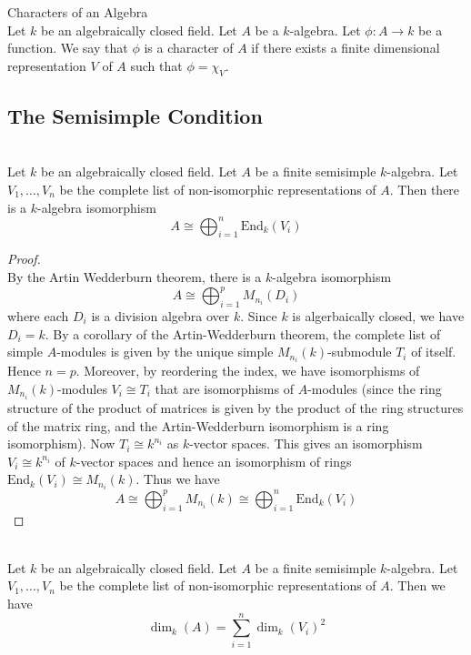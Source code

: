 \documentclass[a4paper]{article}
\begin{document}
\begin{defn}{Characters of an Algebra}{}\\
Let $k$ be an algebraically closed field. Let $A$ be a $k$-algebra. Let $\phi:A\to k$ be a function. We say that $\phi$ is a character of $A$ if there exists a finite dimensional representation $V$ of $A$ such that $\phi=\chi_V$. 
\end{defn}

\subsection{The Semisimple Condition}
\begin{prp}{}{}\\
Let $k$ be an algebraically closed field. Let $A$ be a finite semisimple $k$-algebra. Let $V_1,\dots,V_n$ be the complete list of non-isomorphic representations of $A$. Then there is a $k$-algebra isomorphism $$A\cong\bigoplus_{i=1}^n\text{End}_k(V_i)$$
\begin{proof}\\
By the Artin Wedderburn theorem, there is a $k$-algebra isomorphism $$A\cong\bigoplus_{i=1}^pM_{n_i}(D_i)$$ where each $D_i$ is a division algebra over $k$. Since $k$ is algerbaically closed, we have $D_i=k$. By a corollary of the Artin-Wedderburn theorem, the complete list of simple $A$-modules is given by the unique simple $M_{n_i}(k)$-submodule $T_i$ of itself. Hence $n=p$. Moreover, by reordering the index, we have isomorphisms of $M_{n_i}(k)$-modules $V_i\cong T_i$ that are isomorphisms of $A$-modules (since the ring structure of the product of matrices is given by the product of the ring structures of the matrix ring, and the Artin-Wedderburn isomorphism is a ring isomorphism). Now $T_i\cong k^{n_i}$ as $k$-vector spaces. This gives an isomorphism $V_i\cong k^{n_i}$ of $k$-vector spaces and hence an isomorphism of rings $\text{End}_k(V_i)\cong M_{n_i}(k)$. Thus we have $$A\cong\bigoplus_{i=1}^pM_{n_i}(k)\cong\bigoplus_{i=1}^n\text{End}_k(V_i)$$
\end{proof}
\end{prp}

\begin{crl}{}{}\\
Let $k$ be an algebraically closed field. Let $A$ be a finite semisimple $k$-algebra. Let $V_1,\dots,V_n$ be the complete list of non-isomorphic representations of $A$. Then we have $$\dim_k(A)=\sum_{i=1}^n\dim_k(V_i)^2$$
\end{crl}
\end{document}
